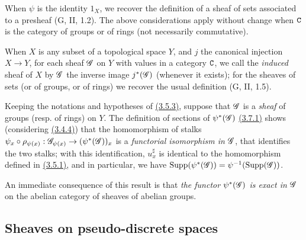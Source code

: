 \begin{env}[3.7.1]
When $\psi$ is the identity $1_X$, we recover the definition of a sheaf of sets
associated to a presheaf (G, II, 1.2). The above considerations apply without
change when $\mathtt{C}$ is the category of groups or of rings (not necessarily
commutative).

When $X$ is any subset of a topological space $Y$, and $j$ the canonical
injection $X\to Y$, for each sheaf $\mathscr{G}$ on $Y$ with values in a category
$\mathtt{C}$, we call the {\em induced} sheaf of $X$ by $\mathscr{G}$ the inverse image
$j^*(\mathscr{G})$ (whenever it exists); for the sheaves of sets (or of groups, or of
rings) we recover the usual definition (G, II, 1.5).
\end{env}

\begin{env}[3.7.2]
\label{env-0.3.7.2}
Keeping the notations and hypotheses of \hyperref[env-0.3.5.3]{(3.5.3)}, suppose that $\mathscr{G}$
is a {\em sheaf} of groups (resp. of rings) on $Y$. The definition of sections
of $\psi^*(\mathscr{G})$ \hyperref[env-0.3.7.1]{(3.7.1)} shows (considering \hyperref[env-0.3.4.4]{(3.4.4)}) that
the homomorphism of stalks
$\psi_x\circ\rho_{\psi(x)}:\mathscr{G}_{\psi(x)}\to(\psi^*(\mathscr{G}))_x$ is a
{\em functorial isomorphism in $\mathscr{G}$}, that identifies the two stalks; with
this identification, $u_x^\sharp$ is identical to the homomorphism defined in
\hyperref[env-0.3.5.1]{(3.5.1)}, and in particular, we have
${\mathop{\mathrm{Supp}}\nolimits}(\psi^*(\mathscr{G}))=\psi^{-1}({\mathop{\mathrm{Supp}}\nolimits}(\mathscr{G}))$.

An immediate consequence of this result is that {\em the functor
$\psi^*(\mathscr{G})$ is exact in $\mathscr{G}$} on the abelian category of sheaves of
abelian groups.
\end{env}

\subsection{Sheaves on pseudo-discrete spaces}
\label{subsection-sheaves-on-pseudo-discrete-spaces}

